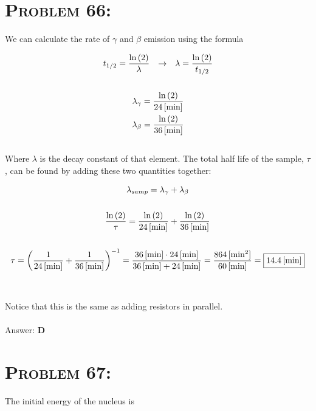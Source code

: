 \documentclass{article}
\begin{document}

\section{\textsc{Problem 66:}} We can calculate the rate of $\gamma$ and $\beta$ emission using the formula

\begin{gather}
t_{1/2}= \frac{\ln{(2)}}{\lambda} \hspace{.1in} \rightarrow \hspace{.1in} \lambda= \frac{\ln{(2)}}{t_{1/2}} \\
\nonumber\\
\lambda_{\gamma}= \frac{\ln{(2)}}{\unit[24]{[min]}}\nonumber\\
\lambda_{\beta}= \frac{\ln{(2)}}{\unit[36]{[min]}}\nonumber
\end{gather}
\\
Where $\lambda$ is the decay constant of that element. The total half life of the sample, $\tau$, can be found by adding these two quantities together:

\begin{gather}
\lambda_{samp} = \lambda_{\gamma} + \lambda_{\beta}\nonumber\\
\nonumber\\
\frac{\ln{(2)}}{\tau} = \frac{\ln{(2)}}{\unit[24]{[min]}} + \frac{\ln{(2)}}{\unit[36]{[min]}} \nonumber\\
\nonumber\\
 \tau = \left(   \frac{1}{\unit[24]{[min]}} + \frac{1}{\unit[36]{[min]}}   \right)^{-1} = \frac{\unit[36]{[min]} \cdot \unit[24]{[min]}}{\unit[36]{[min]} + \unit[24]{[min]}} = \frac{\unit[864]{[min^{2}]}}{\unit[60]{[min]}} = \boxed{\unit[14.4]{[min]} } \nonumber
\end{gather}
\\\\
Notice that this is the same as adding resistors in parallel.
\\\\
Answer: \textbf{\textcolor{ProcessBlue}D}\\


\section{\textsc{Problem 67:}} The initial energy of the nucleus is
\end{document}
